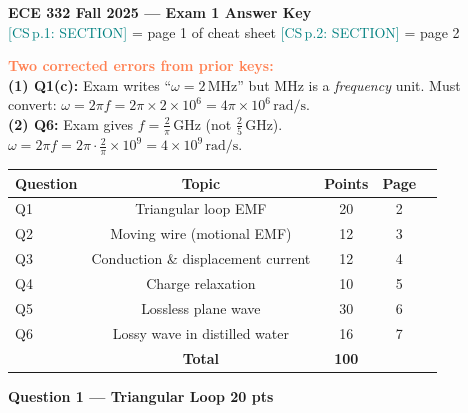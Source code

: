 \documentclass[11pt,letterpaper]{article}
\begin{document}
\begin{center}
  {\Large\textbf{ECE 332 Fall 2025 --- Exam 1 Answer Key}}\\[6pt]
  {\small\textcolor{teal}{[CS\,p.1: SECTION]} = page 1 of cheat sheet \quad
         \textcolor{teal}{[CS\,p.2: SECTION]} = page 2}
\end{center}

\vspace{6pt}

\begin{notebox}
\textbf{\textcolor{coral}{Two corrected errors from prior keys:}}\\[2pt]
\textbf{(1) Q1(c):} Exam writes ``$\omega=2\,\text{MHz}$'' but MHz is a \emph{frequency} unit. Must convert:
$\omega = 2\pi f = 2\pi\times2\times10^6 = 4\pi\times10^6\,\text{rad/s}$.\\[2pt]
\textbf{(2) Q6:} Exam gives $f=\tfrac{2}{\pi}\,\text{GHz}$ (not $\tfrac{2}{5}$\,GHz).
$\omega = 2\pi f = 2\pi\cdot\tfrac{2}{\pi}\times10^9 = 4\times10^9\,\text{rad/s}$.
\end{notebox}

\begin{center}
\renewcommand{\arraystretch}{1.3}
\begin{tabular}{@{}lcccc@{}}
\toprule
Question & Topic & Points & Page\\
\midrule
Q1 & Triangular loop EMF & 20 & 2\\
Q2 & Moving wire (motional EMF) & 12 & 3\\
Q3 & Conduction \& displacement current & 12 & 4\\
Q4 & Charge relaxation & 10 & 5\\
Q5 & Lossless plane wave & 30 & 6\\
Q6 & Lossy wave in distilled water & 16 & 7\\
\midrule
 & \textbf{Total} & \textbf{100} & \\
\bottomrule
\end{tabular}
\end{center}

\newpage
\colorbox{purplebg}{\parbox{\dimexpr\linewidth-2\fboxsep}{\color{purple}\large\textbf{Question 1 --- Triangular Loop \hfill 20 pts}}}
\end{document}
